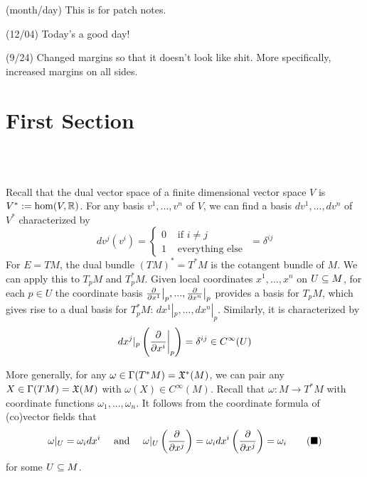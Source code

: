 \documentclass[10pt]{article}
\begin{document}
\def\habauthor{Abbreviation of your name(s)}
\def\hauthor{Full name(s)}
\hsetup
\htoc
\hmain

(month/day) This is for patch notes. 

(12/04) Today's a good day!

(9/24) Changed margins so that it doesn't look like shit. More specifically, increased margins on all sides.

\newpage
\section*{First Section} 
\\\\
\begin{hdefinition}
    Recall that the dual vector space of a finite dimensional vector space $V$ is $V^*:= \hom(V, \mathbb{R})$. For any basis $v^1, ..., v^n$ of $V$, we can find a basis $dv^1, ..., dv^n$ of $V^*$ characterized by 
    $$
        dv^j(v^i) = 
        \begin{cases}
            0 & \text{ if } i\neq j \\
            1 & \text{ everything else } 
        \end{cases}
        =
        \delta^{ij} 
    $$
    For $E = TM$, the dual bundle $(TM)^* = T^*M$ is the cotangent bundle of $M$.
    We can apply this to $T_pM$ and $T^*_pM$. Given local coordinates $x^1,...,x^n$ on $U\subseteq M$, for each $p\in U$ the coordinate basis $\frac{\partial }{\partial x^1}\big|_p, ..., \frac{\partial }{\partial x^n}\big|_p$ provides a basis for $T_pM$, which gives rise to a dual basis for $T^*_pM$: $dx^1|_p,...,dx^n|_p$. Similarly, it is characterized by 
    $$
        dx^j|_p \left( \frac{\partial}{\partial x^i} \bigg|_p\right) = \delta^{ij} \in C^\infty(U)
    $$
    
\end{hdefinition}
\begin{remark}
    More generally, for any $\omega \in \Gamma(T^*M) = \mathfrak{X}^*(M)$, we can pair any $X\in \Gamma(TM) = \mathfrak{X}(M)$ with $\omega(X) \in C^\infty(M)$. Recall that $\omega: M\to T^*M$ with coordinate functions $\omega_1,..., \omega_n$. It follows from the coordinate formula of (co)vector fields that
    \begin{align*}
        \omega|_{U} = \omega_idx^i \quad \text{ and }\quad \omega|_{U} \left( \frac{\partial}{\partial x^j} \right) = \omega_idx^i\left( \frac{\partial}{\partial x^j} \right) = \omega_i \tag{$\blacksquare$}
    \end{align*}
    for some $U\subseteq M$.
\end{remark}
\end{document}
